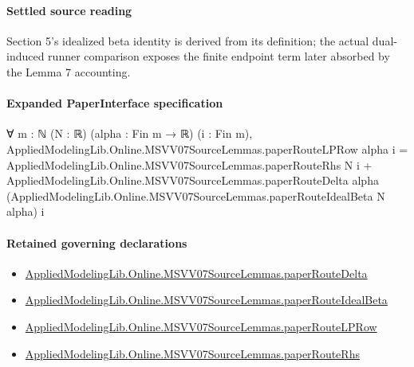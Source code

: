 \documentclass[10pt]{article}
\begin{document}
\paragraph{Settled source reading}
\begin{sloppypar}
Section 5's idealized beta identity is derived from its definition;\allowbreak{} the actual dual-\allowbreak{}induced runner comparison exposes the finite endpoint term later absorbed by the Lemma 7 accounting.\allowbreak{}
\end{sloppypar}

\paragraph{Expanded PaperInterface specification}
\begin{ReviewVerbatim}
∀ {m : ℕ} (N : ℝ) (alpha : Fin m → ℝ) (i : Fin m),
  AppliedModelingLib.Online.MSVV07SourceLemmas.paperRouteLPRow alpha i =
    AppliedModelingLib.Online.MSVV07SourceLemmas.paperRouteRhs N i +
      AppliedModelingLib.Online.MSVV07SourceLemmas.paperRouteDelta alpha
        (AppliedModelingLib.Online.MSVV07SourceLemmas.paperRouteIdealBeta N alpha) i
\end{ReviewVerbatim}

\paragraph{Retained governing declarations}
\begin{itemize}\raggedright
\item \hyperlink{governing-declaration-b9e7309f4b3f7cfa}{Applied\allowbreak{}Modeling\allowbreak{}Lib.\allowbreak{}Online.\allowbreak{}MSVV07\allowbreak{}Source\allowbreak{}Lemmas.\allowbreak{}paper\allowbreak{}Route\allowbreak{}Delta}
\item \hyperlink{governing-declaration-c22e713da25eb3dc}{Applied\allowbreak{}Modeling\allowbreak{}Lib.\allowbreak{}Online.\allowbreak{}MSVV07\allowbreak{}Source\allowbreak{}Lemmas.\allowbreak{}paper\allowbreak{}Route\allowbreak{}Ideal\allowbreak{}Beta}
\item \hyperlink{governing-declaration-5265a7402e3e118f}{Applied\allowbreak{}Modeling\allowbreak{}Lib.\allowbreak{}Online.\allowbreak{}MSVV07\allowbreak{}Source\allowbreak{}Lemmas.\allowbreak{}paper\allowbreak{}Route\allowbreak{}LP\allowbreak{}Row}
\item \hyperlink{governing-declaration-94329c08d124f812}{Applied\allowbreak{}Modeling\allowbreak{}Lib.\allowbreak{}Online.\allowbreak{}MSVV07\allowbreak{}Source\allowbreak{}Lemmas.\allowbreak{}paper\allowbreak{}Route\allowbreak{}Rhs}
\end{itemize}
\end{document}
